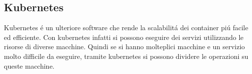 \subsection{Kubernetes}
Kubernetes é un ulteriore software che rende la scalabilitá dei container piú facile ed efficiente. Con kubernetes infatti si possono eseguire dei servizi utilizzando le risorse di diverse macchine. Quindi se si hanno molteplici macchine e un servizio molto difficile da eseguire, tramite kubernetes si possono dividere le operazioni su queste macchine.
